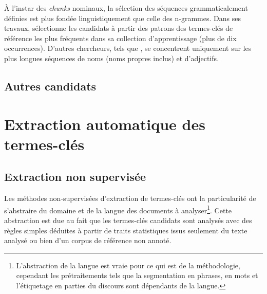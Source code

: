         \begin{example}
        \end{example}

        À l'instar des \textit{chunks} nominaux, la sélection des séquences
        grammaticalement définies est plus fondée linguistiquement que celle des
        n-grammes. Dans ses travaux, 
        sélectionne les candidats à partir des patrons des termes-clés de
        référence les plus fréquents dans sa collection d'apprentissage (plus de
        dix occurrences). D'autres chercheurs, tels que
        , se concentrent uniquement sur les plus
        longues séquences de noms (noms propres inclus) et d'adjectifs.


    \subsection{Autres candidats}
    \label{subsec:main-state_of_the_art-keyphrase_candidate_selection-other_candidates}


  \section{Extraction automatique des termes-clés}
  \label{sec:main-state_of_the_art-automatic_keyphrase_extraction}
    \subsection{Extraction non supervisée}
    \label{subsec:main-state_of_the_art-automatic_keyphrase_extraction-unsupervised_keyphrase_extraction}
      Les méthodes non-supervisées d'extraction de termes-clés ont la
      particularité de s'abstraire du domaine et de la langue des documents à
      analyser\footnote{L'abstraction de la langue est vraie pour ce qui est
      de la méthodologie, cependant les prétraitements tels que la
      segmentation en phrases, en mots et l'étiquetage en parties du discours
      sont dépendants de la langue.}. Cette abstraction est due au fait que
      les termes-clés candidats sont analysés avec des règles simples déduites
      à partir de traits statistiques issus seulement du texte analysé ou bien
      d'un corpus de référence non annoté.


